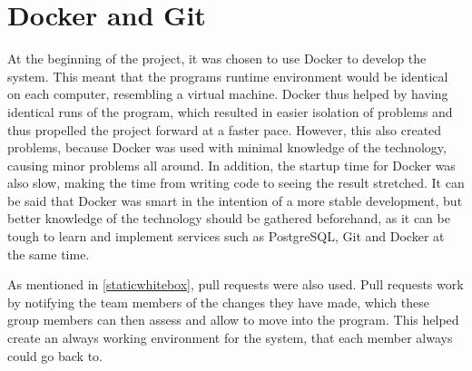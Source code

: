 \section{Docker and Git}
At the beginning of the project, it was chosen to use Docker to develop the system.
This meant that the programs runtime environment would be identical on each computer, resembling a virtual machine.
Docker thus helped by having identical runs of the program, which resulted in easier isolation of problems and thus propelled the project forward at a faster pace.
However, this also created problems, because Docker was used with minimal knowledge of the technology, causing minor problems all around.
In addition, the startup time for Docker was also slow, making the time from writing code to seeing the result stretched.
It can be said that Docker was smart in the intention of a more stable development, but better knowledge of the technology should be gathered beforehand, as it can be tough to learn and implement services such as PostgreSQL, Git and Docker at the same time.

As mentioned in \cref{staticwhitebox}, pull requests were also used.
Pull requests work by notifying the team members of the changes they have made, which these group members can then assess and allow to move into the program.
This helped create an always working environment for the system, that each member always could go back to.
